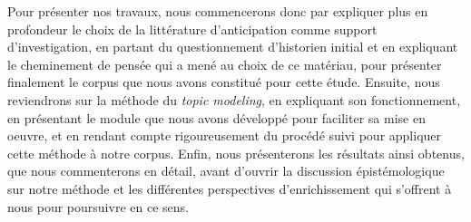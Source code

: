 \documentclass[letterpaper,portrait,12pt]{article}
\begin{document}
	Pour pr\'{e}senter nos travaux, nous commencerons donc par expliquer plus en profondeur le choix de la litt\'{e}rature d'anticipation comme support d'investigation, en partant du questionnement d'historien initial et en expliquant le cheminement de pens\'{e}e qui a men\'{e} au choix de ce mat\'{e}riau, pour pr\'{e}senter finalement le corpus que nous avons constitu\'{e} pour cette \'{e}tude. Ensuite, nous reviendrons sur la m\'{e}thode du \emph{topic modeling}, en expliquant son fonctionnement, en pr\'{e}sentant le module que nous avons d\'{e}velopp\'{e} pour faciliter sa mise en oeuvre, et en rendant compte rigoureusement du proc\'{e}d\'{e} suivi pour appliquer cette m\'{e}thode \`{a} notre corpus. Enfin, nous pr\'{e}senterons les r\'{e}sultats ainsi obtenus, que nous commenterons en d\'{e}tail, avant d'ouvrir la discussion \'{e}pist\'{e}mologique sur notre m\'{e}thode et les diff\'{e}rentes perspectives d'enrichissement qui s'offrent \`{a} nous pour poursuivre en ce sens.
\end{document}
